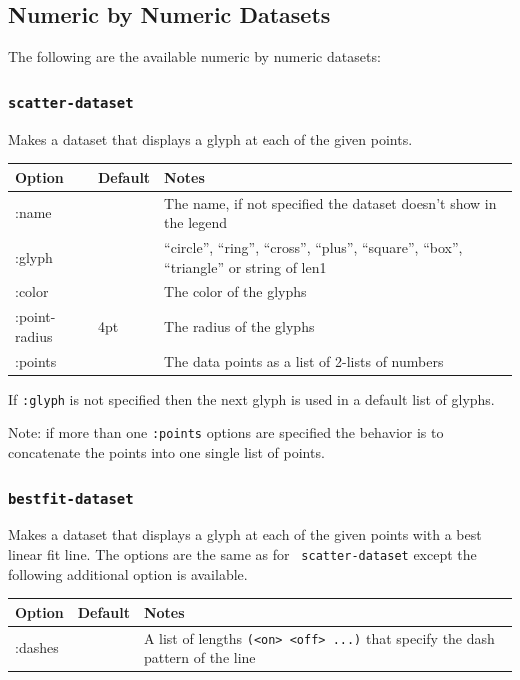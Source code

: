\documentclass{article}
\begin{document}
\subsection{Numeric by Numeric Datasets}

The following are the available numeric by numeric datasets:

\subsubsection{\tt scatter-dataset}

Makes a dataset that displays a glyph at each of the given points.

\begin{center}
\begin{tabular}{lll}
Option & Default & Notes \\
\hline
:name & & The name, if not specified the dataset doesn't show in
the legend\\
:glyph & & ``circle'', ``ring'', ``cross'', ``plus'', ``square'',
``box'', ``triangle'' or string of len1\\
:color & & The color of the glyphs\\
:point-radius & 4pt & The radius of the glyphs\\
:points & & The data points as a list of 2-lists of numbers\\
\end{tabular}
\end{center}

If {\tt :glyph} is not specified then the next glyph is used in a
default list of glyphs.

Note: if more than one {\tt :points} options are specified the
behavior is to concatenate the points into one single list of points.

\subsubsection{\tt bestfit-dataset}

Makes a dataset that displays a glyph at each of the given points with
a best linear fit line.  The options are the same as for {\tt
  scatter-dataset} except the following additional option is
available.

\begin{center}
\begin{tabular}{lll}
Option & Default & Notes \\
\hline
:dashes & & A list of lengths {\tt (<on> <off> ...)} that specify the
dash pattern of the line\\
\end{tabular}
\end{center}
\end{document}
